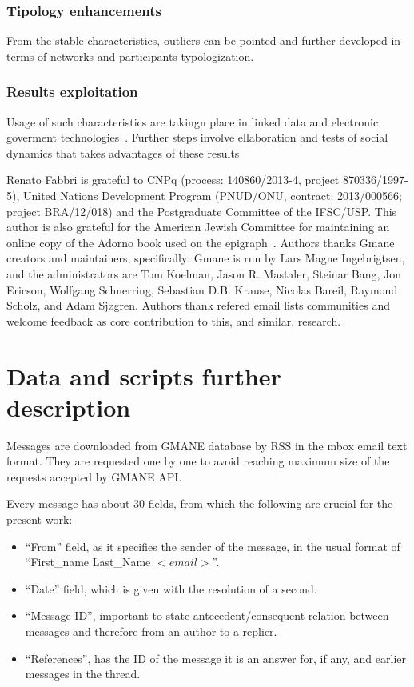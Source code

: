 \documentclass[%
 aip,
 jmp,%
 amsmath,amssymb,
 reprint,%
]{revtex4-1}
\begin{document}
        \subsubsection{Tipology enhancements}
From the stable characteristics, outliers can be pointed and further developed in terms of networks and participants typologization.

        \subsubsection{Results exploitation}
Usage of such characteristics are takingn place in linked data and electronic goverment technologies~\cite{ops,opa}. Further steps involve ellaboration and tests of social dynamics that takes advantages of these results

\begin{acknowledgments}
Renato Fabbri is grateful to CNPq (process: 140860/2013-4,
project 870336/1997-5), United Nations Development Program (PNUD/ONU, contract: 2013/000566; project BRA/12/018)  and 
the Postgraduate Committee of the IFSC/USP. This author is also grateful for
the American Jewish Committee for maintaining an online copy of the Adorno book
used on the epigraph~\cite{adorno}. Authors thanks Gmane creators and maintainers, specifically: Gmane is run by Lars Magne Ingebrigtsen, and the administrators are Tom Koelman, Jason R. Mastaler, Steinar Bang, Jon Ericson, Wolfgang Schnerring, Sebastian D.B. Krause, Nicolas Bareil, Raymond Scholz, and Adam Sjøgren. Authors thank refered email lists communities and welcome feedback as core contribution to this, and similar, research.
\end{acknowledgments}


\appendix
\section{Data and scripts further description}\label{scripts}
Messages are downloaded from GMANE database by RSS in the mbox email text format. 
They are requested one by one to avoid reaching maximum size of the requests accepted by
GMANE API. 

Every message has about 30 fields, from which the following are crucial
for the present work:
\begin{itemize}
    \item ``From'' field, as it specifies the sender of the message, in the usual format of ``First\_name Last\_Name $<email>$''.
    \item ``Date'' field, which is given with the resolution of a second.
    \item ``Message-ID'', important to state antecedent/consequent relation between messages and therefore from an author to a replier.
    \item ``References'', has the ID of the message it is an answer for, if any, and earlier messages in the thread.
\end{itemize}
\end{document}
